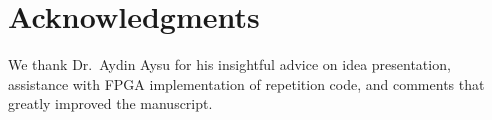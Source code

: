 \section*{Acknowledgments}
We thank Dr.~Aydin Aysu for his insightful advice on idea presentation, assistance with FPGA implementation of repetition code, and comments that greatly improved the manuscript.